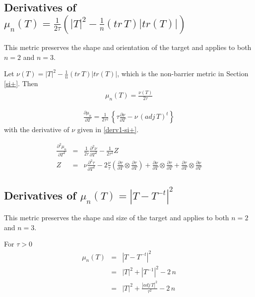 \documentclass{report}
\begin{document}
\subsection{Derivatives of $\mu_n(T) = \frac{1}{2\tau} \left( |T|^2 - \frac{1}{n} (tr \, T) |tr(T)| \right)$ \label{nu-over-tau}}

\noindent This metric preserves the shape and orientation of the target and
applies to both $n=2$ and $n=3$. \newline

\noindent Let $\nu(T) = |T|^2 - \frac{1}{n} (tr \, T) |tr(T)|$, which is the 
non-barrier metric in Section \ref{si+}. Then
\begin{eqnarray}
\mu_n(T) = \frac{\nu(T)}{2 \tau}
\end{eqnarray}

\begin{eqnarray}
\frac{\partial \mu_n}{\partial T} = \frac{1}{2 \tau^2} \, \left\{ \tau \frac{\partial \nu}{\partial T} - \nu \, (adj \, T)^t \right\}
\end{eqnarray}
with the derivative of $\nu$ given in \ref{derv1-si+}. \newline

\begin{eqnarray}
\frac{\partial^2 \mu_n}{\partial T^2} & = & \frac{1}{2 \tau} \frac{\partial^2 \nu}{\partial T^2} - \frac{1}{2 \tau^2} Z \\
Z & = & \nu \frac{\partial^2 \tau}{\partial T^2} - 2 \frac{\nu}{\tau} \left( \frac{\partial \tau}{\partial T} \otimes \frac{\partial \tau}{\partial T} \right) + \frac{\partial \nu}{\partial T} \otimes \frac{\partial \tau}{\partial T} + \frac{\partial \tau}{\partial T} \otimes \frac{\partial \nu}{\partial T}
\end{eqnarray}

\subsection{Derivatives of $\mu_n(T)=|T-T^{-t}|^2$ \label{ss+1} }

\noindent This metric preserves the shape and size of the target and applies
to both $n=2$ and $n=3$. \newline

\noindent For $\tau>0$
\begin{eqnarray}
\mu_n(T) & = & |T-T^{-t}|^2 \\
         & = & |T|^2 + |T^{-1}|^2 - 2 \, n \\
         & = & |T|^2 + \frac{|adj \, T|^2}{\tau^2} - 2 \, n
\end{eqnarray}
\end{document}
